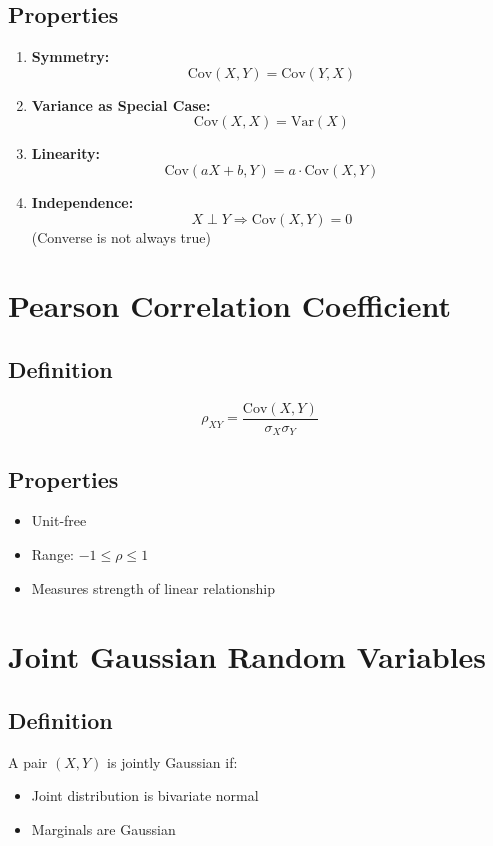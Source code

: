 \documentclass[11pt]{article}
\begin{document}
\subsection{Properties}
\begin{enumerate}
    \item \textbf{Symmetry:}
    \[
    \text{Cov}(X,Y) = \text{Cov}(Y,X)
    \]

    \item \textbf{Variance as Special Case:}
    \[
    \text{Cov}(X,X) = \text{Var}(X)
    \]

    \item \textbf{Linearity:}
    \[
    \text{Cov}(aX + b, Y) = a \cdot \text{Cov}(X,Y)
    \]

    \item \textbf{Independence:}
    \[
    X \perp Y \Rightarrow \text{Cov}(X,Y) = 0
    \]
    (Converse is not always true)
\end{enumerate}

\section{Pearson Correlation Coefficient}

\subsection{Definition}
\[
\rho_{XY} = \frac{\text{Cov}(X,Y)}{\sigma_X \sigma_Y}
\]

\subsection{Properties}
\begin{itemize}
    \item Unit-free
    \item Range: $-1 \leq \rho \leq 1$
    \item Measures strength of linear relationship
\end{itemize}

\section{Joint Gaussian Random Variables}

\subsection{Definition}
A pair $(X,Y)$ is jointly Gaussian if:
\begin{itemize}
    \item Joint distribution is bivariate normal
    \item Marginals are Gaussian
\end{itemize}
\end{document}
